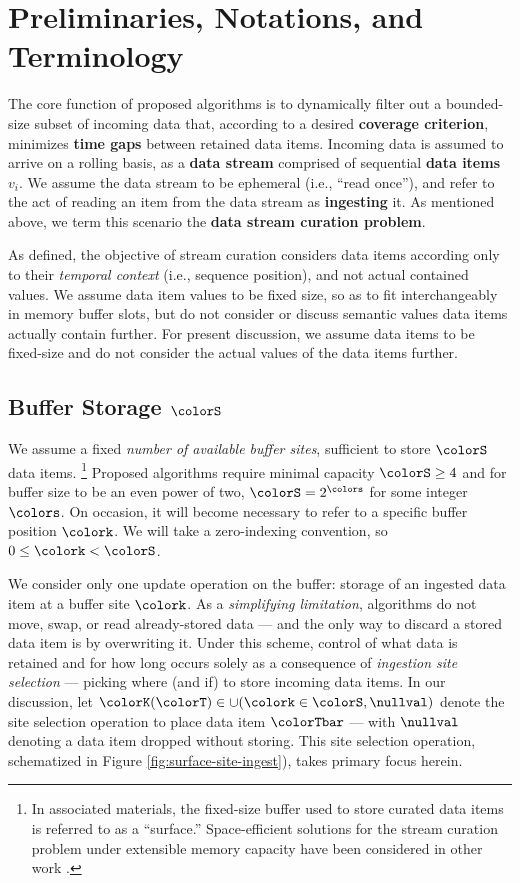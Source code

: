 \section{Preliminaries, Notations, and Terminology} \label{sec:notation}

The core function of proposed algorithms is to dynamically filter out a bounded-size subset of incoming data that, according to a desired \textbf{coverage criterion}, minimizes \textbf{time gaps} between retained data items.
Incoming data is assumed to arrive on a rolling basis, as a \textbf{data stream} comprised of sequential \textbf{data items} $v_i$.
We assume the data stream to be ephemeral (i.e., ``read once''), and refer to the act of reading an item from the data stream as \textbf{ingesting} it.
As mentioned above, we term this scenario the \textbf{data stream curation problem}.

As defined, the objective of stream curation considers data items according only to their \textit{temporal context} (i.e., sequence position), and not actual contained values.
We assume data item values to be fixed size, so as to fit interchangeably in memory buffer slots, but do not consider or discuss semantic values data items actually contain further.
For present discussion, we assume data items to be fixed-size and do not consider the actual values of the data items further.



\subsection{Buffer Storage $\colorS$}
\label{sec:notation-buffer}

We assume a fixed \textit{number of available buffer sites}, sufficient to store $\colorS$ data items.%
\footnote{%
In associated materials, the fixed-size buffer used to store curated data items is referred to as a ``surface.''
Space-efficient solutions for the stream curation problem under extensible memory capacity have been considered in other work \citep{moreno2024algorithms}.%
}
Proposed algorithms require minimal capacity $\colorS\geq4$ and for buffer size to be an even power of two, $\colorS = 2^{\colors}$ for some integer $\colors$.
On occasion, it will become necessary to refer to a specific buffer position $\colork$.
We will take a zero-indexing convention, so $0 \leq \colork < \colorS$.

We consider only one update operation on the buffer: storage of an ingested data item at a buffer site $\colork$.
As a \textit{simplifying limitation}, algorithms do not move, swap, or read already-stored data --- and the only way to discard a stored data item is by overwriting it.
Under this scheme, control of what data is retained and for how long occurs solely as a consequence of \textit{ingestion site selection} --- picking where (and if) to store incoming data items.
In our discussion, let $\colorK(\colorT) \in \cup(\colork \in \colorS, \nullval)$ denote the site selection operation to place data item $\colorTbar$ --- with $\nullval$ denoting a data item dropped without storing.
This site selection operation, schematized in Figure \ref{fig:surface-site-ingest}), takes primary focus herein.

